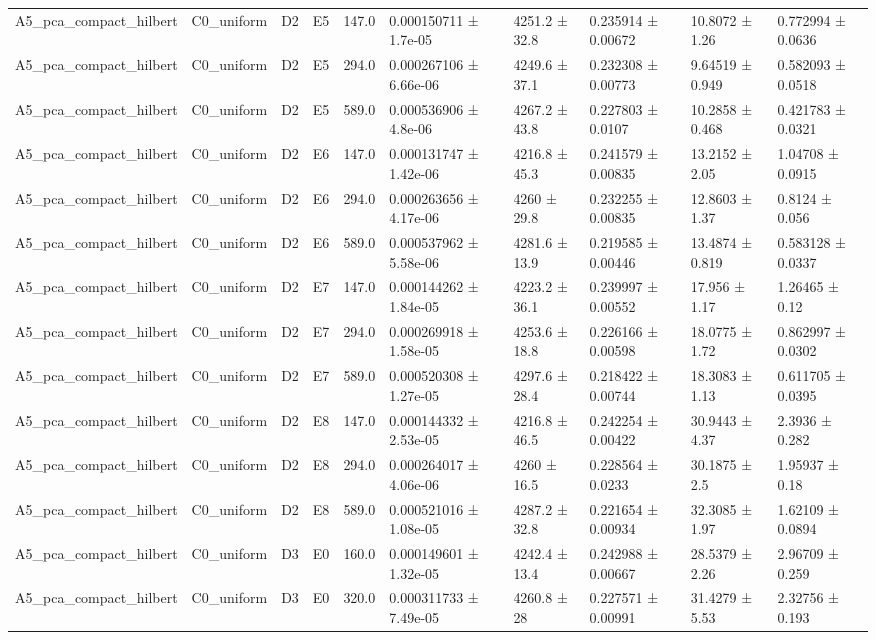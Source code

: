 \begin{table}
\begin{tabular}{llllllllll}
A5\_pca\_compact\_hilbert & C0\_uniform & D2 & E5 & 147.0 & 0.000150711 ± 1.7e-05 & 4251.2 ± 32.8 & 0.235914 ± 0.00672 & 10.8072 ± 1.26 & 0.772994 ± 0.0636 \\
A5\_pca\_compact\_hilbert & C0\_uniform & D2 & E5 & 294.0 & 0.000267106 ± 6.66e-06 & 4249.6 ± 37.1 & 0.232308 ± 0.00773 & 9.64519 ± 0.949 & 0.582093 ± 0.0518 \\
A5\_pca\_compact\_hilbert & C0\_uniform & D2 & E5 & 589.0 & 0.000536906 ± 4.8e-06 & 4267.2 ± 43.8 & 0.227803 ± 0.0107 & 10.2858 ± 0.468 & 0.421783 ± 0.0321 \\
A5\_pca\_compact\_hilbert & C0\_uniform & D2 & E6 & 147.0 & 0.000131747 ± 1.42e-06 & 4216.8 ± 45.3 & 0.241579 ± 0.00835 & 13.2152 ± 2.05 & 1.04708 ± 0.0915 \\
A5\_pca\_compact\_hilbert & C0\_uniform & D2 & E6 & 294.0 & 0.000263656 ± 4.17e-06 & 4260 ± 29.8 & 0.232255 ± 0.00835 & 12.8603 ± 1.37 & 0.8124 ± 0.056 \\
A5\_pca\_compact\_hilbert & C0\_uniform & D2 & E6 & 589.0 & 0.000537962 ± 5.58e-06 & 4281.6 ± 13.9 & 0.219585 ± 0.00446 & 13.4874 ± 0.819 & 0.583128 ± 0.0337 \\
A5\_pca\_compact\_hilbert & C0\_uniform & D2 & E7 & 147.0 & 0.000144262 ± 1.84e-05 & 4223.2 ± 36.1 & 0.239997 ± 0.00552 & 17.956 ± 1.17 & 1.26465 ± 0.12 \\
A5\_pca\_compact\_hilbert & C0\_uniform & D2 & E7 & 294.0 & 0.000269918 ± 1.58e-05 & 4253.6 ± 18.8 & 0.226166 ± 0.00598 & 18.0775 ± 1.72 & 0.862997 ± 0.0302 \\
A5\_pca\_compact\_hilbert & C0\_uniform & D2 & E7 & 589.0 & 0.000520308 ± 1.27e-05 & 4297.6 ± 28.4 & 0.218422 ± 0.00744 & 18.3083 ± 1.13 & 0.611705 ± 0.0395 \\
A5\_pca\_compact\_hilbert & C0\_uniform & D2 & E8 & 147.0 & 0.000144332 ± 2.53e-05 & 4216.8 ± 46.5 & 0.242254 ± 0.00422 & 30.9443 ± 4.37 & 2.3936 ± 0.282 \\
A5\_pca\_compact\_hilbert & C0\_uniform & D2 & E8 & 294.0 & 0.000264017 ± 4.06e-06 & 4260 ± 16.5 & 0.228564 ± 0.0233 & 30.1875 ± 2.5 & 1.95937 ± 0.18 \\
A5\_pca\_compact\_hilbert & C0\_uniform & D2 & E8 & 589.0 & 0.000521016 ± 1.08e-05 & 4287.2 ± 32.8 & 0.221654 ± 0.00934 & 32.3085 ± 1.97 & 1.62109 ± 0.0894 \\
A5\_pca\_compact\_hilbert & C0\_uniform & D3 & E0 & 160.0 & 0.000149601 ± 1.32e-05 & 4242.4 ± 13.4 & 0.242988 ± 0.00667 & 28.5379 ± 2.26 & 2.96709 ± 0.259 \\
A5\_pca\_compact\_hilbert & C0\_uniform & D3 & E0 & 320.0 & 0.000311733 ± 7.49e-05 & 4260.8 ± 28 & 0.227571 ± 0.00991 & 31.4279 ± 5.53 & 2.32756 ± 0.193 \\

\end{tabular}
\end{table}
